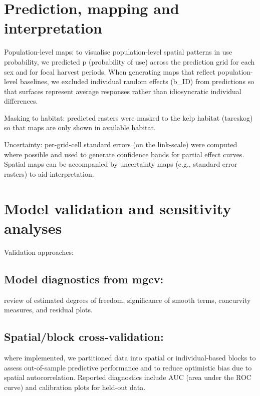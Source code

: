 \documentclass[
  letterpaper,
  DIV=11,
  numbers=noendperiod]{scrartcl}
\begin{document}
\section{Prediction, mapping and
interpretation}\label{prediction-mapping-and-interpretation}

Population-level maps: to visualise population-level spatial patterns in
use probability, we predicted p (probability of use) across the
prediction grid for each sex and for focal harvest periods. When
generating maps that reflect population-level baselines, we excluded
individual random effects (b\_ID) from predictions so that surfaces
represent average responses rather than idiosyncratic individual
differences.

Masking to habitat: predicted rasters were masked to the kelp habitat
(tareskog) so that maps are only shown in available habitat.

Uncertainty: per-grid-cell standard errors (on the link-scale) were
computed where possible and used to generate confidence bands for
partial effect curves. Spatial maps can be accompanied by uncertainty
maps (e.g., standard error rasters) to aid interpretation.

\section{Model validation and sensitivity
analyses}\label{model-validation-and-sensitivity-analyses}

Validation approaches:

\subsection{Model diagnostics from
mgcv:}\label{model-diagnostics-from-mgcv}

review of estimated degrees of freedom, significance of smooth terms,
concurvity measures, and residual plots.

\subsection{Spatial/block
cross-validation:}\label{spatialblock-cross-validation}

where implemented, we partitioned data into spatial or individual-based
blocks to assess out-of-sample predictive performance and to reduce
optimistic bias due to spatial autocorrelation. Reported diagnostics
include AUC (area under the ROC curve) and calibration plots for
held-out data.
\end{document}
